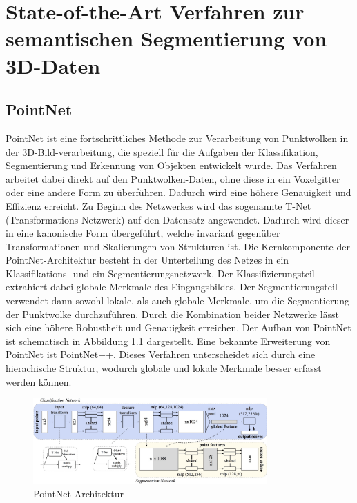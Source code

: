 \chapter{State-of-the-Art Verfahren zur semantischen Segmentierung von 3D-Daten}
\section{PointNet}
PointNet ist eine fortschrittliches Methode zur Verarbeitung von Punktwolken in
der 3D-Bild-verarbeitung, die speziell für die Aufgaben der Klassifikation,
Segmentierung und Erkennung von Objekten entwickelt wurde. Das Verfahren
arbeitet dabei direkt auf den Punktwolken-Daten, ohne diese in ein Voxelgitter
oder eine andere Form zu überführen. Dadurch wird eine höhere Genauigkeit und
Effizienz erreicht. Zu Beginn des Netzwerkes wird das sogenannte T-Net
(Transformations-Netzwerk) auf den Datensatz angewendet. Dadurch wird dieser in
eine kanonische Form übergeführt, welche invariant gegenüber Transformationen
und Skalierungen von Strukturen ist. Die Kernkomponente der PointNet-Architektur besteht in
der Unterteilung des Netzes in ein Klassifikations- und ein
Segmentierungsnetzwerk. Der Klassifizierungsteil extrahiert dabei globale
Merkmale des Eingangsbildes. Der Segmentierungsteil verwendet dann sowohl
lokale, als auch globale Merkmale, um die Segmentierung der Punktwolke
durchzuführen. Durch die Kombination beider Netzwerke lässt sich eine höhere
Robustheit und Genauigkeit erreichen. Der Aufbau von PointNet ist schematisch
in Abbildung \ref{fig:pointnet} dargestellt. \cite{8099499} Eine bekannte
Erweiterung von PointNet ist PointNet++. Dieses Verfahren unterscheidet sich
durch eine hierachische Struktur, wodurch globale und lokale Merkmale besser
erfasst werden können. \cite{NIPS2017_d8bf84be}

\begin{figure}[h]
    \centering
    \includegraphics[width=0.8\textwidth]{bilder/pointnet.jpg}
    \captionsetup{font=small} %

    \caption[PointNet-Architektur]{PointNet-Architektur \cite{8099499}}
    \label{fig:pointnet}
\end{figure}

